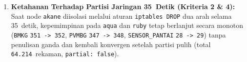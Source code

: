 \begin{enumerate}
    \item \textbf{Ketahanan Terhadap Partisi Jaringan 35~Detik (Kriteria 2 \& 4):} Saat node \texttt{akane} diisolasi melalui aturan \texttt{iptables DROP} dua arah selama 35~detik, kepemimpinan pada \texttt{aqua} dan \texttt{ruby} tetap berlanjut secara monoton (\texttt{BMKG} \texttt{351 -> 352}, \texttt{PVMBG} \texttt{347 -> 348}, \texttt{SENSOR\_PANTAI} \texttt{28 -> 29}) tanpa penulisan ganda dan kembali konvergen setelah partisi pulih (total \texttt{64.214}~rekaman, \texttt{partial: false}).
\end{enumerate}


\vspace{1em}

